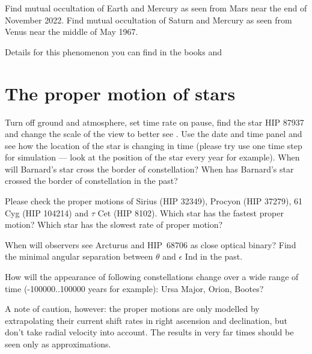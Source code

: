 Find mutual occultation of Earth and Mercury as seen from 
Mars near the end of November 2022. Find mutual occultation 
of Saturn and Mercury as seen from Venus near the middle of 
May 1967.

Details for this phenomenon you can find in the books 
 and 

\section{The proper motion of stars}
\label{sec:Exercises:ProperMotion}

Turn off ground and atmosphere, set time rate on pause, 
find the star HIP 87937 and change the scale of the view 
to better see . Use the date and 
time panel and see how the location of the star is 
changing in time (please try use one time step for 
simulation --- look at the position of the star every 
year for example). When will Barnard's star cross 
the border of constellation? When has Barnard's star  
crossed the border of constellation in the past? 

Please check the proper motions of Sirius (HIP 32349), 
Procyon (HIP 37279), 61 Cyg (HIP 104214) and $\tau$ Cet 
(HIP 8102). Which star has the fastest proper motion? Which 
star has the slowest rate of proper motion?

When will observers see Arcturus and HIP~68706 as close optical binary? 
Find the minimal angular separation between $\theta$ and $\epsilon$ Ind in the past.

How will the appearance of following constellations change 
over a wide range of time (-100000..100000 years for 
example): Ursa Major, Orion, Bootes?

A note of caution, however: the proper motions are only modelled by extrapolating their current 
shift rates in right ascension and declination, but don't take radial velocity into account. 
The results in very far times should be seen only as approximations.

